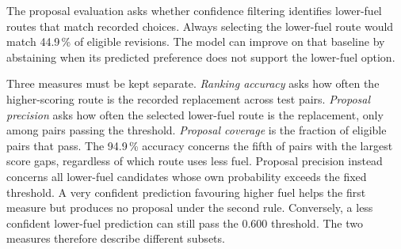\documentclass[conference,10pt,a4paper,IEEEoverridecommandlockouts]{IEEEtran}
\begin{document}




The proposal evaluation asks whether confidence filtering identifies
lower-fuel routes that match recorded choices. Always selecting the
lower-fuel route would match 44.9\,\% of eligible revisions. The model
can improve on that baseline by abstaining when its predicted preference
does not support the lower-fuel option.

Three measures must be kept separate. \emph{Ranking accuracy} asks how
often the higher-scoring route is the recorded replacement across test
pairs. \emph{Proposal precision} asks how often the selected lower-fuel
route is the replacement, only among pairs passing the threshold.
\emph{Proposal coverage} is the fraction of eligible pairs that pass.
The 94.9\,\% accuracy concerns the fifth of pairs with the largest
score gaps, regardless of which route uses less fuel. Proposal precision
instead concerns all lower-fuel candidates whose own probability exceeds
the fixed threshold. A very confident prediction favouring higher fuel
helps the first measure but produces no proposal under the second rule.
Conversely, a less confident lower-fuel prediction can still pass the
0.600 threshold. The two measures therefore describe different subsets.
\end{document}
